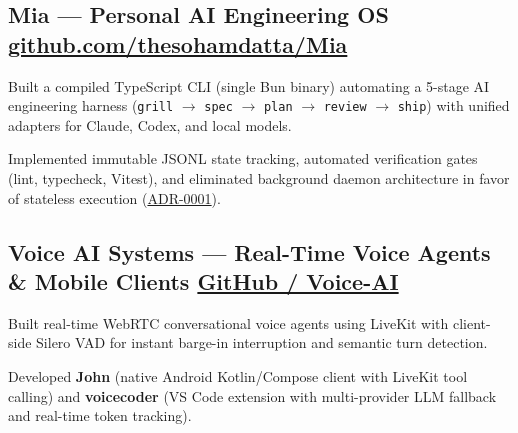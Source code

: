 
\subsection[Mia --- Personal AI Engineering OS]{{Mia} \textnormal{--- Personal AI Engineering OS} \hfill \href{https://github.com/thesohamdatta/Mia}{github.com/thesohamdatta/Mia}}
\begin{zitemize}
\item Built a compiled TypeScript CLI (single Bun binary) automating a 5-stage AI engineering harness (\texttt{grill} $\rightarrow$ \texttt{spec} $\rightarrow$ \texttt{plan} $\rightarrow$ \texttt{review} $\rightarrow$ \texttt{ship}) with unified adapters for Claude, Codex, and local models.
\item Implemented immutable JSONL state tracking, automated verification gates (lint, typecheck, Vitest), and eliminated background daemon architecture in favor of stateless execution (\href{https://github.com/thesohamdatta/Mia/blob/main/docs/decisions/ADR-0001-eliminate-daemon.md}{ADR-0001}).
\end{zitemize}

\subsection[Voice AI Systems --- Real-Time Agents and Clients]{{Voice AI Systems} \textnormal{--- Real-Time Voice Agents \& Mobile Clients} \hfill \href{https://github.com/thesohamdatta/John}{GitHub / Voice-AI}}
\begin{zitemize}
\item Built real-time WebRTC conversational voice agents using LiveKit with client-side Silero VAD for instant barge-in interruption and semantic turn detection.
\item Developed \textbf{John} (native Android Kotlin/Compose client with LiveKit tool calling) and \textbf{voicecoder} (VS Code extension with multi-provider LLM fallback and real-time token tracking).
\end{zitemize}


